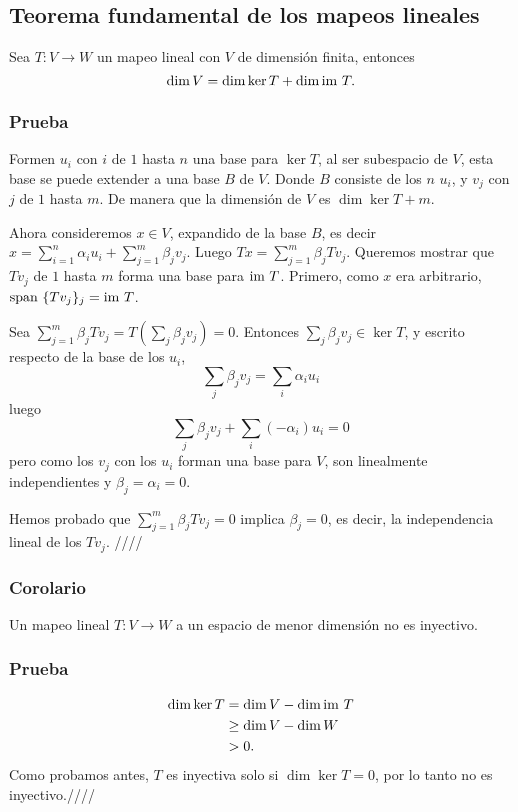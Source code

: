 \documentclass{article}
\begin{document}
\subsection{Teorema fundamental de los mapeos lineales}
Sea $T: V\rightarrow W$ un mapeo lineal con $V$ de dimensión finita,
entonces
$$\dim V = \dim\ker T + \dim\text{im } T.$$

\subsubsection*{Prueba}
Formen $u_i$ con $i$ de $1$ hasta $n$ una base para $\ker T$,
al ser subespacio de $V$, esta base se puede extender a una base $B$
de $V$. Donde $B$ consiste de los $n$ $u_i$, y
$v_j$ con $j$ de $1$ hasta $m$. De manera que la dimensión de $V$
es $\dim\ker T+m$.

Ahora consideremos $x\in V$, expandido de la base $B$, es decir\\
$x= \sum^n_{i=1}\alpha_iu_i + \sum^m_{j=1}\beta_jv_j$. Luego
$Tx = \sum^m_{j=1}\beta_jTv_j$. Queremos mostrar que $Tv_j$ de
$1$ hasta $m$ forma una base para $\text{im } T$. Primero, como $x$ era arbitrario, $\text{span } \{Tv_j\}_j = \text{im } T$.

Sea $\sum^m_{j=1}\beta_jTv_j = T(\sum_j\beta_jv_j)=0$.
Entonces $\sum_j\beta_jv_j \in \ker T$, y escrito respecto de la base
de los $u_i$,
$$\sum_j\beta_jv_j = \sum_i\alpha_iu_i$$
luego
$$\sum_j\beta_jv_j + \sum_i(-\alpha_i)u_i = 0$$
pero como los $v_j$ con los $u_i$ forman una base para $V$,
son linealmente independientes y $\beta_j=\alpha_i=0$.

Hemos probado que $\sum^m_{j=1}\beta_jTv_j = 0$ implica
$\beta_j = 0$, es decir, la independencia lineal de los $Tv_j$.
\hfill ////

\subsubsection{Corolario}
Un mapeo lineal $T:V\rightarrow W$ a un espacio de menor dimensión no es inyectivo.
\subsubsection*{Prueba}
\begin{align*}
\dim\ker T &= \dim V - \dim\text{im } T\\
    &\geq \dim V - \dim W\\
    &> 0.
\end{align*}
Como probamos antes, $T$ es inyectiva solo si $\dim \ker T = 0$,
por lo tanto no es inyectivo.\hfill ////
\end{document}
